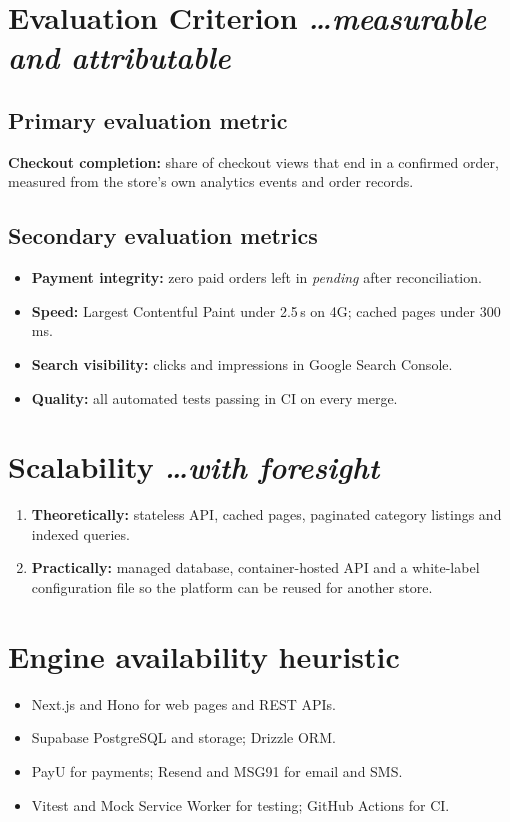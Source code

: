 \documentclass[11pt,a4paper]{article}
\newcommand{\BvrHint}[1]{%
  {\normalfont\normalsize\itshape\hfill #1}}
\begin{document}
\section{Evaluation Criterion %
\BvrHint{\ldots measurable and attributable}}
\subsection{Primary evaluation metric}
\textbf{Checkout completion:} share of checkout views that end in a confirmed
order, measured from the store's own analytics events and order records.

\subsection{Secondary evaluation metrics}
\begin{itemize}[leftmargin=0.7cm]
    \item \textbf{Payment integrity:} zero paid orders left in \emph{pending}
          after reconciliation.
    \item \textbf{Speed:} Largest Contentful Paint under 2.5\,s on 4G; cached
          pages under 300\,ms.
    \item \textbf{Search visibility:} clicks and impressions in Google Search
          Console.
    \item \textbf{Quality:} all automated tests passing in CI on every merge.
\end{itemize}

\section{Scalability %
\BvrHint{\ldots with foresight}}
\begin{enumerate}[leftmargin=0.7cm]
    \item \textbf{Theoretically:} stateless API, cached pages, paginated
          category listings and indexed queries.
    \item \textbf{Practically:} managed database, container-hosted API and a
          white-label configuration file so the platform can be reused for
          another store.
\end{enumerate}

\section{Engine availability heuristic}
\begin{itemize}[leftmargin=0.7cm]
    \item Next.js and Hono for web pages and REST APIs.
    \item Supabase PostgreSQL and storage; Drizzle ORM.
    \item PayU for payments; Resend and MSG91 for email and SMS.
    \item Vitest and Mock Service Worker for testing; GitHub Actions for CI.
\end{itemize}
\end{document}
